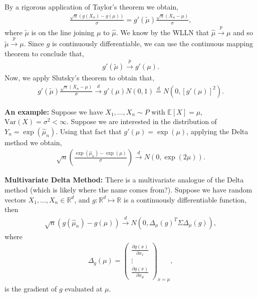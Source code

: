 \documentclass[twoside,12pt]{article}
\newcommand{\cdist}{\overset{d}{\rightarrow}}
\newcommand{\edist}{\overset{d}{=}}
\newcommand{\cprob}{\overset{p}{\rightarrow}}
\begin{document}
By a rigorous application of Taylor's theorem we obtain,
\begin{align*}
\frac{\sqrt{n} (g(X_n) - g(\mu))}{\sigma} = g'(\widetilde{\mu}) \frac{ \sqrt{n} (X_n - \mu)}{\sigma},
\end{align*}
where $\widetilde{\mu}$ is on the line joining $\mu$ to $\widehat{\mu}$. We know by the WLLN that 
$\widehat{\mu} \cprob \mu$ and so $\widetilde{\mu} \cprob \mu$. Since $g$ is continuously differentiable, we can use the continuous mapping theorem to conclude that,
\begin{align*}
g'(\widetilde{\mu}) \cprob g'(\mu).
\end{align*}
Now, we apply Slutsky's theorem to obtain that,
\begin{align*}
 g'(\widetilde{\mu}) \frac{ \sqrt{n} (X_n - \mu)}{\sigma} \cdist  g'(\mu) N(0,1) \edist N(0, [g'(\mu)]^2).
\end{align*}


{\bf An example: } Suppose we have $X_1,\ldots,X_n \sim P$ with $\mathbb{E}[X] = \mu$, $\text{Var}(X) = \sigma^2 < \infty$. Suppose we are interested in the distribution of $Y_n = \exp( \widehat{\mu}_n).$ Using that fact that $g'(\mu) = \exp(\mu)$, applying the Delta method we obtain,
\begin{align*}
\sqrt{n} \left(\frac{\exp( \widehat{\mu}_n) - \exp(\mu)}{\sigma}\right) \cdist N(0, \exp(2\mu)).
\end{align*}


{\bf Multivariate Delta Method: } There is a multivariate analogue of the Delta method (which is likely where the name comes from?).
Suppose we have random vectors $X_1,\ldots,X_n \in \mathbb{R}^d$, and $g: \mathbb{R}^d \mapsto \mathbb{R}$ is a continuously differentiable function, then 
\begin{align*}
\sqrt{n} (g(\widehat{\mu}_n) - g(\mu)) \cdist N(0, \Delta_\mu(g)^T \Sigma \Delta_\mu(g)),
\end{align*}
where 
\begin{align*}
\Delta_g(\mu) = \left( \begin{array}{c} \frac{\partial g(x)}{\partial x_1} \\ \vdots \\ \frac{\partial g(x)}{\partial x_d}
\end{array} \right)_{x = \mu},
\end{align*}
is the gradient of $g$ evaluated at $\mu$.
\end{document}
